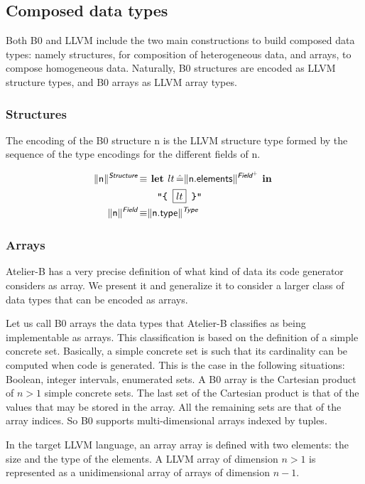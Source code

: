 \documentclass{article}
\newcommand{\trad}[2]{\ensuremath{\lVert \textsf{#1} \rVert^{\textit{#2}}}}
\DeclareMathOperator{\isdef}{\equiv}
\newcommand{\llvm}[1]{\texttt{#1}}
\newcommand{\B}[1]{\textsf{#1}}
\newcommand{\ListOf}[1]{$\mbox{#1}^+$}
\newcommand{\LET}[0]{\textbf{ let }}
\DeclareMathOperator{\BE}{\hat{=}}
\newcommand{\IN}[0]{\textbf{ in }}
\newcommand{\PH}[1]{\framebox{$#1$}}
\begin{document}
\subsection{Composed data types}

Both B0 and LLVM include the two main constructions to build composed
data types: namely structures, for composition of heterogeneous data,
and arrays, to compose homogeneous data. Naturally, B0 structures are
encoded as LLVM structure types, and B0 arrays as LLVM array types.

\subsubsection{Structures}

The encoding of the B0 structure \B{n} is the LLVM structure type
formed by the sequence of the type encodings for the different fields
of \B{n}.

\begin{align*}
  \trad{\B{n}}{\B{Structure}} \isdef
  & \LET lt \BE \trad{\B{n.elements}}{\ListOf{\B{Field}}} \IN\\
  & \quad \llvm{"\{ \PH{lt} \}"} \\
  \trad{\B{n}}{\B{Field}} \isdef
  & \trad{\B{n.type}}{\B{Type}}
\end{align*}

\subsubsection{Arrays}
\label{sec:types:arrays}

Atelier-B has a very precise definition of what kind of data its code
generator considers as array. We present it and generalize it to
consider a larger class of data types that can be encoded as arrays.

Let us call B0 arrays the data types that Atelier-B classifies as
being implementable as arrays. This classification is based on the
definition of a simple concrete set. Basically, a simple concrete set
is such that its cardinality can be computed when code is generated.
This is the case in the following situations: Boolean, integer
intervals, enumerated sets. A B0 array is the Cartesian product of $n
> 1$ simple concrete sets. The last set of the Cartesian product is that
of the values that may be stored in the array. All the remaining sets are
that of the array indices. So B0 supports multi-dimensional arrays indexed
by tuples.

In the target LLVM language, an array array is defined with two
elements: the size and the type of the elements. A LLVM array of
dimension $n > 1$ is represented as a unidimensional array of arrays
of dimension $n-1$.
\end{document}

